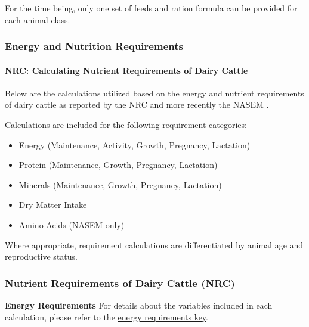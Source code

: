 \documentclass{article}
\begin{document}
\begin{refsection}
\begin{tcolorbox}[colback=white, colframe=black, title=Important Note]
For the time being, only one set of feeds and ration formula can be provided for each animal class. 
\end{tcolorbox}







\subsubsection{Energy and Nutrition Requirements}

\paragraph{NRC: Calculating Nutrient Requirements of Dairy Cattle} \label{sec:enreq}

Below are the calculations utilized based on the energy and nutrient requirements of dairy cattle as reported by the NRC and more recently the NASEM \parencite{nrc2001, nrc2021}.
\vspace{0.2cm}

Calculations are included for the following requirement categories:
\begin{itemize}
    \item Energy (Maintenance, Activity, Growth, Pregnancy, Lactation)
    \item Protein (Maintenance, Growth, Pregnancy, Lactation)
    \item Minerals (Maintenance, Growth, Pregnancy, Lactation)
    \item Dry Matter Intake
    \item Amino Acids (NASEM only) 
\end{itemize}
\vspace{0.2cm}

Where appropriate, requirement calculations are differentiated by animal age and reproductive status.
\vspace{0.5cm}

\subsubsection{Nutrient Requirements of Dairy Cattle (NRC)} \label{sec:NRC}

    \textbf{ Energy Requirements} For details about the variables included in each calculation, please refer to the \hyperref[energykey]{energy requirements key}.
    \vspace{0.2cm}
    

\end{refsection}
\end{document}
